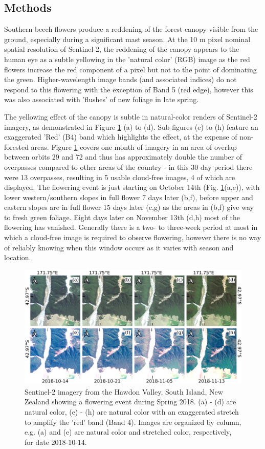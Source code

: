 \documentclass[remotesensing,article,submit,moreauthors,pdftex]{Definitions/mdpi}
\begin{document}
\subsection{Methods}
Southern beech flowers produce a reddening of the forest canopy visible from the ground, especially during a significant mast season. At the 10 m pixel nominal spatial resolution of Sentinel-2, the reddening of the canopy appears to the human eye as a subtle yellowing in the 'natural color' (RGB) image as the red flowers increase the red component of a pixel but not to the point of dominating the green. Higher-wavelength image bands (and associated indices) do not respond to this flowering with the exception of Band 5 (red edge), however this was also associated with 'flushes' of new foliage in late spring. 

The yellowing effect of the canopy is subtle in natural-color renders of Sentinel-2 imagery, as demonstrated in Figure \ref{fig:rgb} (a) to (d). Sub-figures (e) to (h) feature an exaggerated 'Red' (B4) band which highlights the effect, at the expense of non-forested areas. Figure \ref{fig:rgb} covers one month of imagery in an area of overlap between orbits 29 and 72 and thus has approximately double the number of overpasses compared to other areas of the country - in this 30 day period there were 13 overpasses, resulting in 5 usable cloud-free images, 4 of which are displayed. The flowering event is just starting on October 14th (Fig. \ref{fig:rgb}(a,e)), with lower western/southern slopes in full flower 7 days later (b,f), before upper and eastern slopes are in full flower 15 days later (c,g) as the areas in (b,f) give way to fresh green foliage. Eight days later on November 13th (d,h) most of the flowering has vanished. Generally there is a two- to three-week period at most in which a cloud-free image is required to observe flowering, however there is no way of reliably knowing when this window occurs as it varies with season and location.

\begin{figure}[H]
    \centering
    \includegraphics[width=\textwidth]{images/figure1_rgb.pdf}
    \caption{Sentinel-2 imagery from the Hawdon Valley, South Island, New Zealand showing a flowering event during Spring 2018. (a) - (d) are natural color, (e) - (h) are natural color with an exaggerated stretch to amplify the 'red' band (Band 4). Images are organized by column, e.g. (a) and (e) are natural color and stretched color, respectively, for date 2018-10-14.}
    \label{fig:rgb}
\end{figure}  
\end{document}
